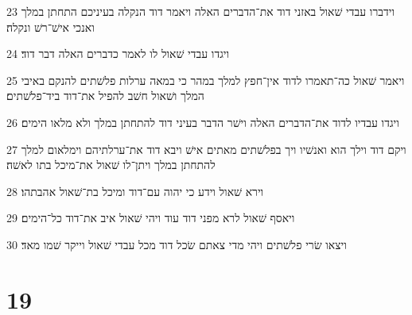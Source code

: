 \par 23 וידברו עבדי שׁאול באזני דוד את־הדברים האלה ויאמר דוד הנקלה בעיניכם התחתן במלך ואנכי אישׁ־רשׁ ונקלה׃
\par 24 ויגדו עבדי שׁאול לו לאמר כדברים האלה דבר דוד׃
\par 25 ויאמר שׁאול כה־תאמרו לדוד אין־חפץ למלך במהר כי במאה ערלות פלשׁתים להנקם באיבי המלך ושׁאול חשׁב להפיל את־דוד ביד־פלשׁתים׃
\par 26 ויגדו עבדיו לדוד את־הדברים האלה וישׁר הדבר בעיני דוד להתחתן במלך ולא מלאו הימים׃
\par 27 ויקם דוד וילך הוא ואנשׁיו ויך בפלשׁתים מאתים אישׁ ויבא דוד את־ערלתיהם וימלאום למלך להתחתן במלך ויתן־לו שׁאול את־מיכל בתו לאשׁה׃
\par 28 וירא שׁאול וידע כי יהוה עם־דוד ומיכל בת־שׁאול אהבתהו׃
\par 29 ויאסף שׁאול לרא מפני דוד עוד ויהי שׁאול איב את־דוד כל־הימים׃
\par 30 ויצאו שׂרי פלשׁתים ויהי מדי צאתם שׂכל דוד מכל עבדי שׁאול וייקר שׁמו מאד׃

\chapter{19}

